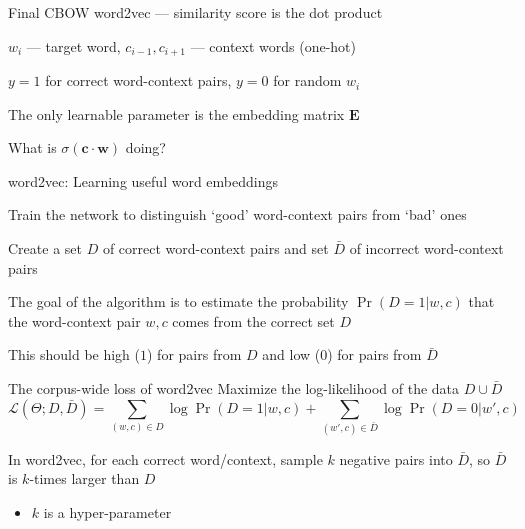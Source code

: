 \documentclass[12pt,aspectratio=169,handout]{beamer}
\begin{document}
\begin{frame}{Final CBOW word2vec --- similarity score is the dot product}
\begin{figure}
	\end{figure}	
	
	$w_i$ --- target word, $c_{i-1}, c_{i+1}$ --- context words (one-hot)
	
	$y = 1$ for correct word-context pairs, $y = 0$ for random $w_i$
	
	The only learnable parameter is the embedding matrix $\bm{E}$
	
	What is $\sigma(\bm{c} \cdot \bm{w})$ doing?
	
\end{frame}

\begin{frame}{word2vec: Learning useful word embeddings}
	
Train the network to distinguish `good' word-context pairs from `bad' ones

Create a set $D$ of correct word-context pairs and set $\bar{D}$ of incorrect word-context pairs

The goal of the algorithm is to estimate the probability $\Pr(D = 1 | w, c)$ that the word-context pair $w, c$ comes from the correct set $D$

This should be high ($1$) for pairs from $D$ and low ($0$) for pairs from $\bar{D}$
\end{frame}

\begin{frame}{The corpus-wide loss of word2vec}
Maximize the log-likelihood of the data $D \cup \bar{D}$
$$
\mathcal{L}(\Theta; D, \bar{D}) =
\sum_{(w, c) \in D} \log \Pr (D = 1 | w, c) +
\sum_{(w', c) \in \bar{D}} \log \Pr (D = 0 | w', c)
$$

\bigskip

In word2vec, for each correct word/context, sample $k$ negative pairs into $\bar{D}$, so $\bar{D}$ is $k$-times larger than $D$
\begin{itemize}
	\item $k$ is a hyper-parameter
\end{itemize}
\end{frame}
\end{document}
